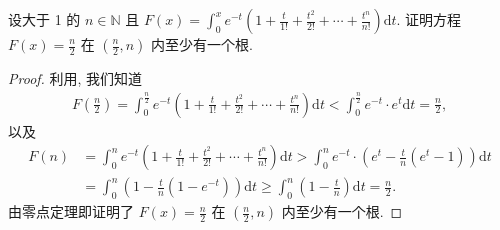 \documentclass[../../main.tex]{subfiles}%
\begin{document}
\begin{example}
设大于 1 的 $n \in \mathbb{N}$ 且 $F(x) = \int_0^x e^{-t}\left(1 + \frac{t}{1!} + \frac{t^2}{2!} + \cdots + \frac{t^n}{n!}\right)\mathrm{d}t$. 证明方程 $F(x) = \frac{n}{2}$ 在 $\left(\frac{n}{2}, n\right)$ 内至少有一个根.
\end{example}
\begin{proof}

利用, 我们知道
\begin{align*}
F\left(\frac{n}{2}\right) = \int_0^{\frac{n}{2}} e^{-t}\left(1 + \frac{t}{1!} + \frac{t^2}{2!} + \cdots + \frac{t^n}{n!}\right)\mathrm{d}t < \int_0^{\frac{n}{2}} e^{-t} \cdot e^t \mathrm{d}t = \frac{n}{2},
\end{align*}
以及
\begin{align*}
F(n)&=\int_0^n{e^{-t}\left( 1+\frac{t}{1!}+\frac{t^2}{2!}+\cdots +\frac{t^n}{n!} \right) \mathrm{d}t}>\int_0^n{e^{-t}}\cdot \left( e^t-\frac{t}{n}\left( e^t-1 \right) \right) \mathrm{d}t
\\
&=\int_0^n{\left( 1-\frac{t}{n}\left( 1-e^{-t} \right) \right) \mathrm{d}t}\geqslant \int_0^n{\left( 1-\frac{t}{n} \right) \mathrm{d}t}=\frac{n}{2}.
\end{align*}
由零点定理即证明了 $F(x) = \frac{n}{2}$ 在 $\left(\frac{n}{2}, n\right)$ 内至少有一个根.

\end{proof}
\end{document}
